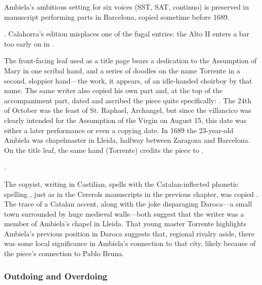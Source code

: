 Ambiela's ambitious setting for six voices (SST, SAT, continuo) is preserved in
manuscript performing parts in Barcelona, copied sometime before 1689.%
\begin{Footnote}
    .
    Calahorra's edition misplaces one of the fugal entries: the
    Alto II enters a bar too early on  in
    .
\end{Footnote}
The front-facing leaf used as a title page bears a dedication to the Assumption
of Mary in one scribal hand, and a series of doodles on the name Torrente in a
second, sloppier hand---the work, it appears, of an idle-handed choirboy by
that name.
The same writer also copied his own  part and, at the top of the
accompaniment part, dated and ascribed the piece quite specifically:
.
The 24th of October was the feast of St. Raphael, Archangel, but since the
villancico was clearly intended for the Assumption of the Virgin on August 15,
this date was either a later performance or even a copying date.
In 1689 the 23-year-old Ambiela was chapelmaster in Lleida, halfway between
Zaragoza and Barcelona.  
On the title leaf, the same hand (Torrente) credits the piece to .%
\begin{Footnote}
    .
\end{Footnote}
The copyist, writing in Castilian, spells  with the
Catalan-inflected phonetic spelling ,
just as in the Cererols manuscripts in the previous chapter,
 was copied .  
The trace of a Catalan accent, along with the joke disparaging Daroca---a small
town surrounded by huge medieval walls---both suggest that the writer was a
member of Ambiela's chapel in Lleida.
That young master Torrente highlights Ambiela's previous position in Daroca
suggests that, regional rivalry aside, there was some local significance in
Ambiela's connection to that city, likely because of the piece's connection to
Pablo Bruna.

\subsubsection{Outdoing and Overdoing}

